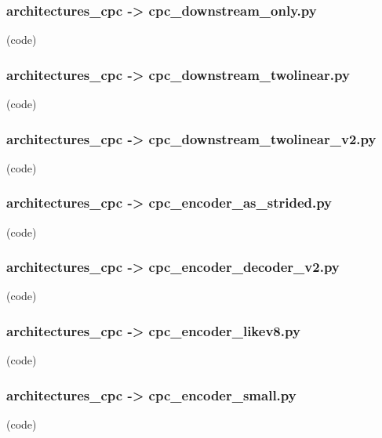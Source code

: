 \begin{myparindent}{0pt}
\noindent\subsubsection[cpc\_downstream\_only.py]{architectures\_cpc -> cpc\_downstream\_only.py} (code)

\noindent\subsubsection[cpc\_downstream\_twolinear.py]{architectures\_cpc -> cpc\_downstream\_twolinear.py} (code)

\noindent\subsubsection[cpc\_downstream\_twolinear\_v2.py]{architectures\_cpc -> cpc\_downstream\_twolinear\_v2.py} (code)

\noindent\subsubsection[cpc\_encoder\_as\_strided.py]{architectures\_cpc -> cpc\_encoder\_as\_strided.py} (code)

\noindent\subsubsection[cpc\_encoder\_decoder\_v2.py]{architectures\_cpc -> cpc\_encoder\_decoder\_v2.py} (code)

\noindent\subsubsection[cpc\_encoder\_likev8.py]{architectures\_cpc -> cpc\_encoder\_likev8.py} (code)

\noindent\subsubsection[cpc\_encoder\_small.py]{architectures\_cpc -> cpc\_encoder\_small.py} (code)

\end{myparindent}
